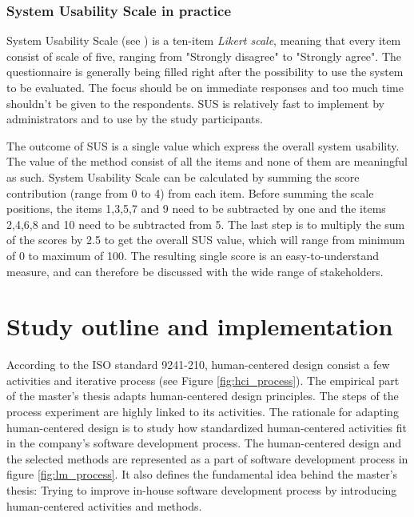 \documentclass[12pt,a4paper,oneside,pdftex]{report}
\begin{document}
\subsection{System Usability Scale in practice}
System Usability Scale (see ) is a ten-item \emph{Likert scale}, meaning that every item consist of scale of five, ranging from "Strongly disagree" to "Strongly agree". The questionnaire is generally being filled right after the possibility to use the system to be evaluated. The focus should be on immediate responses and too much time shouldn't be given to the respondents. SUS is relatively fast to implement by administrators and to use by the study participants. \cite{RefWorks:10} 

The outcome of SUS is a single value which express the overall system usability. The value of the method consist of all the items and none of them are meaningful as such. System Usability Scale can be calculated by summing the score contribution (range from 0 to 4) 		from each item. Before summing the scale positions, the items 1,3,5,7 and 9 need to be subtracted by one and the items 2,4,6,8 and 10 need to be subtracted from 5. The last step is to multiply the sum of the scores by 2.5 to get the overall SUS value, which will range from minimum of 0 to maximum of 100. \cite{RefWorks:10} The resulting single score is an easy-to-understand measure, and can therefore be discussed with the wide range of stakeholders. \cite{RefWorks:12} 
    
\chapter{Study outline and implementation}
\label{chapter:implementation}

According to the ISO standard 9241-210, human-centered design consist a few activities and iterative process (see Figure \ref{fig:hci_process}). \cite{RefWorks:16} The empirical part of the master's thesis adapts human-centered design principles. The steps of the process experiment are highly linked to its activities. The rationale for adapting human-centered design is to study how standardized human-centered activities fit in the company's software development process. The human-centered design and the selected methods are represented as a part of software development process in figure \ref{fig:lm_process}. It also defines the fundamental idea behind the master's thesis: Trying to improve in-house software development process by introducing human-centered activities and methods.
\end{document}
